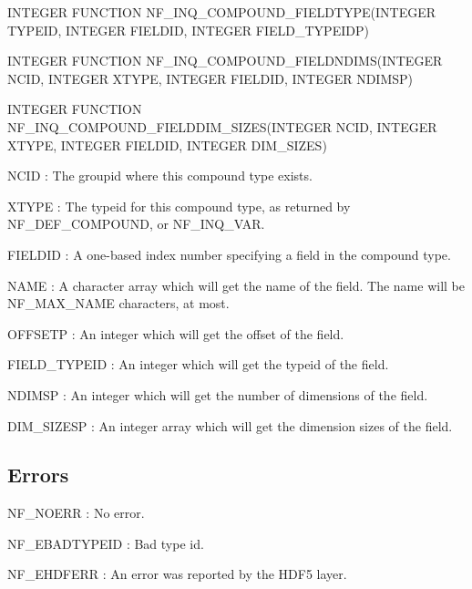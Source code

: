 I\+N\+T\+E\+G\+ER F\+U\+N\+C\+T\+I\+ON N\+F\+\_\+\+I\+N\+Q\+\_\+\+C\+O\+M\+P\+O\+U\+N\+D\+\_\+\+F\+I\+E\+L\+D\+T\+Y\+PE(I\+N\+T\+E\+G\+ER T\+Y\+P\+E\+ID, I\+N\+T\+E\+G\+ER F\+I\+E\+L\+D\+ID, I\+N\+T\+E\+G\+ER F\+I\+E\+L\+D\+\_\+\+T\+Y\+P\+E\+I\+DP)

I\+N\+T\+E\+G\+ER F\+U\+N\+C\+T\+I\+ON N\+F\+\_\+\+I\+N\+Q\+\_\+\+C\+O\+M\+P\+O\+U\+N\+D\+\_\+\+F\+I\+E\+L\+D\+N\+D\+I\+MS(I\+N\+T\+E\+G\+ER N\+C\+ID, I\+N\+T\+E\+G\+ER X\+T\+Y\+PE, I\+N\+T\+E\+G\+ER F\+I\+E\+L\+D\+ID, I\+N\+T\+E\+G\+ER N\+D\+I\+M\+SP)

I\+N\+T\+E\+G\+ER F\+U\+N\+C\+T\+I\+ON N\+F\+\_\+\+I\+N\+Q\+\_\+\+C\+O\+M\+P\+O\+U\+N\+D\+\_\+\+F\+I\+E\+L\+D\+D\+I\+M\+\_\+\+S\+I\+Z\+ES(I\+N\+T\+E\+G\+ER N\+C\+ID, I\+N\+T\+E\+G\+ER X\+T\+Y\+PE, I\+N\+T\+E\+G\+ER F\+I\+E\+L\+D\+ID, I\+N\+T\+E\+G\+ER D\+I\+M\+\_\+\+S\+I\+Z\+ES)

{\ttfamily N\+C\+ID} \+: The groupid where this compound type exists.

{\ttfamily X\+T\+Y\+PE} \+: The typeid for this compound type, as returned by N\+F\+\_\+\+D\+E\+F\+\_\+\+C\+O\+M\+P\+O\+U\+ND, or N\+F\+\_\+\+I\+N\+Q\+\_\+\+V\+AR.

{\ttfamily F\+I\+E\+L\+D\+ID} \+: A one-\/based index number specifying a field in the compound type.

{\ttfamily N\+A\+ME} \+: A character array which will get the name of the field. The name will be N\+F\+\_\+\+M\+A\+X\+\_\+\+N\+A\+ME characters, at most.

{\ttfamily O\+F\+F\+S\+E\+TP} \+: An integer which will get the offset of the field.

{\ttfamily F\+I\+E\+L\+D\+\_\+\+T\+Y\+P\+E\+ID} \+: An integer which will get the typeid of the field.

{\ttfamily N\+D\+I\+M\+SP} \+: An integer which will get the number of dimensions of the field.

{\ttfamily D\+I\+M\+\_\+\+S\+I\+Z\+E\+SP} \+: An integer array which will get the dimension sizes of the field.

\subsection*{Errors }

{\ttfamily N\+F\+\_\+\+N\+O\+E\+RR} \+: No error.

{\ttfamily N\+F\+\_\+\+E\+B\+A\+D\+T\+Y\+P\+E\+ID} \+: Bad type id.

{\ttfamily N\+F\+\_\+\+E\+H\+D\+F\+E\+RR} \+: An error was reported by the H\+D\+F5 layer.

